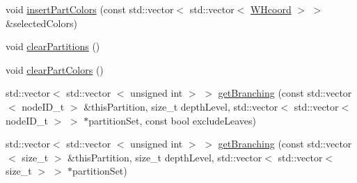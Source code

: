 \begin{DoxyCompactItemize}
\item 
void \hyperlink{classWHtree_aae629a3810d9c9dad305fc3024a32d39}{insert\-Part\-Colors} (const std\-::vector$<$ std\-::vector$<$ \hyperlink{classWHcoord}{\-W\-Hcoord} $>$ $>$ \&selected\-Colors)
\item 
void \hyperlink{classWHtree_a764ababf846cb18b5039d35b3dd02051}{clear\-Partitions} ()
\item 
void \hyperlink{classWHtree_a788d7d3be48109af762b2fba429a171b}{clear\-Part\-Colors} ()
\item 
std\-::vector$<$ std\-::vector\*
$<$ unsigned int $>$ $>$ \hyperlink{classWHtree_afeb2829af19346f661662004c3888b2d}{get\-Branching} (const std\-::vector$<$ node\-I\-D\-\_\-t $>$ \&this\-Partition, size\-\_\-t depth\-Level, std\-::vector$<$ std\-::vector$<$ node\-I\-D\-\_\-t $>$ $>$ $\ast$partition\-Set, const bool exclude\-Leaves)
\item 
std\-::vector$<$ std\-::vector\*
$<$ unsigned int $>$ $>$ \hyperlink{classWHtree_a0128fc5f21ebf318ef83c8c113e0e7f1}{get\-Branching} (const std\-::vector$<$ size\-\_\-t $>$ \&this\-Partition, size\-\_\-t depth\-Level, std\-::vector$<$ std\-::vector$<$ size\-\_\-t $>$ $>$ $\ast$partition\-Set)
\end{DoxyCompactItemize}
